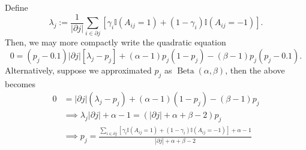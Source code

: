 \documentclass[12pt,onecolumn,letterpaper]{article}
\begin{document}
Define
\begin{equation*}
  \lambda_j:=\frac{1}{|\partial j|}\sum_{i\in\partial j}\left[\gamma_i\mathbb{I}(A_{ij}=1)+(1-\gamma_i)\mathbb{I}(A_{ij}=-1)\right].
\end{equation*}
Then, we may more compactly write the quadratic equation
\begin{equation*}
  0=(p_j-0.1)|\partial j|[\lambda_j-p_j]+(\alpha-1)p_j(1-p_j)-(\beta-1)p_j(p_j-0.1).
\end{equation*}
Alternatively, suppose we approximated $p_j$ as $\operatorname{Beta}(\alpha,\beta)$, then the above becomes
\begin{align*}
  0&=|\partial j|(\lambda_j-p_j)+(\alpha-1)(1-p_j)-(\beta-1)p_j\\
  &\implies \lambda_j|\partial j|+\alpha-1=(|\partial j|+\alpha+\beta-2)p_j\\
  &\implies p_j=\frac{\sum_{i\in\partial j}\left[\gamma_i\mathbb{I}(A_{ij}=1)+(1-\gamma_i)\mathbb{I}(A_{ij}=-1)\right]+\alpha-1}{|\partial j|+\alpha+\beta-2}
\end{align*}
\end{document}
